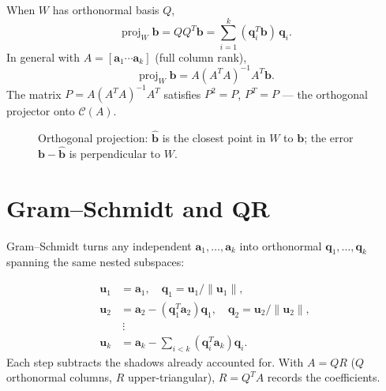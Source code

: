 When $W$ has orthonormal basis $Q$,
\[
  \operatorname{proj}_W\mathbf{b}=QQ^T\mathbf{b}=\sum_{i=1}^{k}(\mathbf{q}_i^T\mathbf{b})\,\mathbf{q}_i.
\]
In general with $A=[\mathbf{a}_1\cdots\mathbf{a}_k]$ (full column rank),
\[
  \operatorname{proj}_W\mathbf{b}=A(A^TA)^{-1}A^T\mathbf{b}.
\]
The matrix $P=A(A^TA)^{-1}A^T$ satisfies $P^2=P$, $P^T=P$ --- the orthogonal projector onto $\mathcal{C}(A)$.

\begin{figure}[h]
\centering
{}
\caption{Orthogonal projection: $\hat{\mathbf{b}}$ is the closest point in $W$ to $\mathbf{b}$; the error $\mathbf{b}-\hat{\mathbf{b}}$ is perpendicular to $W$.}
\label{fig:projection-subspace}
\end{figure}

\section{Gram--Schmidt and QR}
\label{sec:gram-schmidt}
Gram--Schmidt turns any independent $\mathbf{a}_1,\dots,\mathbf{a}_k$ into orthonormal $\mathbf{q}_1,\dots,\mathbf{q}_k$ spanning the same nested subspaces:

\begin{align}
  \mathbf{u}_1&=\mathbf{a}_1,\quad \mathbf{q}_1=\mathbf{u}_1/\|\mathbf{u}_1\|,\\
  \mathbf{u}_2&=\mathbf{a}_2-(\mathbf{q}_1^T\mathbf{a}_2)\mathbf{q}_1,\quad \mathbf{q}_2=\mathbf{u}_2/\|\mathbf{u}_2\|,\\
  &\ \vdots\\
  \mathbf{u}_k&=\mathbf{a}_k-\sum_{i<k}(\mathbf{q}_i^T\mathbf{a}_k)\mathbf{q}_i.
\end{align}
Each step subtracts the shadows already accounted for. With $A=QR$ ($Q$ orthonormal columns, $R$ upper-triangular), $R=Q^TA$ records the coefficients.

